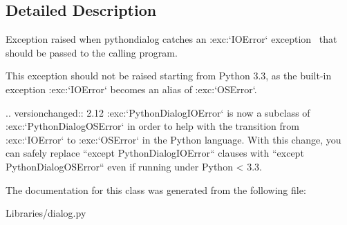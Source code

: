 \subsection{Detailed Description}
\begin{DoxyVerb}Exception raised when pythondialog catches an :exc:`IOError` exception \
that should be passed to the calling program.

This exception should not be raised starting from Python 3.3, as the
built-in exception :exc:`IOError` becomes an alias of
:exc:`OSError`.

.. versionchanged:: 2.12
   :exc:`PythonDialogIOError` is now a subclass of
   :exc:`PythonDialogOSError` in order to help with the transition
   from :exc:`IOError` to :exc:`OSError` in the Python language.
   With this change, you can safely replace ``except
   PythonDialogIOError`` clauses with ``except PythonDialogOSError``
   even if running under Python < 3.3.\end{DoxyVerb}
 

The documentation for this class was generated from the following file\+:\begin{DoxyCompactItemize}
\item 
Libraries/dialog.\+py\end{DoxyCompactItemize}

